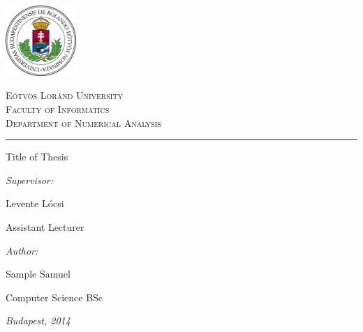 \begin{titlepage}

\noindent
\parbox[m]{0.2\textwidth}{
 \includegraphics[width=0.2\textwidth]{elte_logo_color.eps} %
}
\hfill
\parbox[m]{0.7\textwidth}{
\begin{center}
\begin{large}
\textsc{
Eötvös Loránd University\\
\vspace{0.5pc}
Faculty of Informatics\\
\vspace{0.5pc}
Department of Numerical Analysis\\
}
\end{large}
\end{center}
}

\vspace{1pc}
\hrule

\vfill

\begin{center}
{\LARGE Title of Thesis}
\end{center}

\vfill

\noindent
\hspace*{0.05\textwidth}
\parbox{0.45\textwidth}{
{\it Supervisor:}
\bigskip

{\Large Levente Lócsi}
\smallskip

Assistant Lecturer
}
\hfill
\parbox{0.45\textwidth}{
{\it Author:}
\bigskip

{\Large Sample Samuel}
\smallskip

Computer Science BSc
}


\vfill

\begin{center}
{\large {\it Budapest, 2014}}
\end{center}

\end{titlepage}
